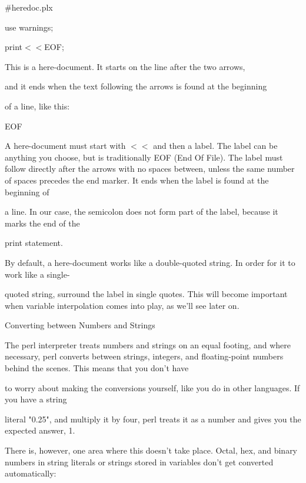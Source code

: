 \documentclass[a4paper,11pt]{book}
\begin{document}
\noindent \#heredoc.plx

\noindent use warnings;

\noindent print$<$$<$EOF;

\noindent 

\noindent This is a here-document. It starts on the line after the two arrows,

\noindent and it ends when the text following the arrows is found at the beginning

\noindent of a line, like this:

\noindent 

\noindent EOF

\noindent 

\noindent A here-document must start with $<$$<$ and then a label. The label can be anything you choose, but is traditionally EOF (End Of File). The label must follow directly after the arrows with no spaces between, unless the same number of spaces precedes the end marker. It ends when the label is found at the beginning of

\noindent a line. In our case, the semicolon does not form part of the label, because it marks the end of the

\noindent print statement.

\noindent 

\noindent 

\noindent By default, a here-document works like a double-quoted string. In order for it to work like a single-

\noindent quoted string, surround the label in single quotes. This will become important when variable interpolation comes into play, as we'll see later on.

\noindent 

\noindent Converting between Numbers and Strings

\noindent 

\noindent The perl interpreter treats numbers and strings on an equal footing, and where necessary, perl converts between strings, integers, and floating-point numbers behind the scenes. This means that you don't have

\noindent to worry about making the conversions yourself, like you do in other languages. If you have a string

\noindent literal "0.25", and multiply it by four, perl treats it as a number and gives you the expected answer, 1.

\noindent 

\noindent There is, however, one area where this doesn't take place. Octal, hex, and binary numbers in string literals or strings stored in variables don't get converted automatically:
\end{document}

